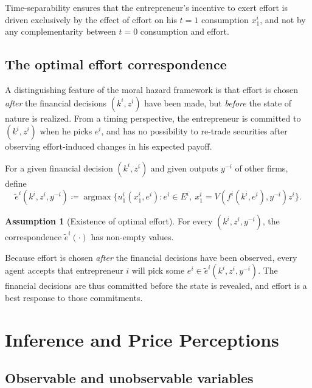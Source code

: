 \documentclass[11pt,a4paper,oneside]{book}
\DeclareMathOperator*{\argmax}{argmax}
\theoremstyle{plain}
\theoremstyle{definition}
\newtheorem{assumption}[theorem]{Assumption}
\theoremstyle{remark}
\numberwithin{equation}{chapter}
\begin{document}
Time-separability ensures that the entrepreneur's incentive to exert effort is driven exclusively by the effect of effort on his $t=1$ consumption $x^i_1$, and not by any complementarity between $t=0$ consumption and effort.

\subsection{The optimal effort correspondence}

A distinguishing feature of the moral hazard framework is that effort is chosen \emph{after} the financial decisions $(k^i, z^i)$ have been made, but \emph{before} the state of nature is realized.
From a timing perspective, the entrepreneur is committed to $(k^i, z^i)$ when he picks $e^i$, and has no possibility to re-trade securities after observing effort-induced changes in his expected payoff.

For a given financial decision $(k^i, z^i)$ and given outputs $y^{-i}$ of other firms, define
\begin{equation}\label{eq:opt-effort}
  \widetilde{e}^i(k^i, z^i, y^{-i})
  \coloneqq \argmax \bigl\{ u^i_1(x^i_1, e^i) \colon e^i \in E^i, \ x^i_1 = V(f^i(k^i, e^i), y^{-i}) z^i \bigr\}.
\end{equation}

\begin{assumption}[Existence of optimal effort]\label{ass:opt-effort-exists}
For every $(k^i, z^i, y^{-i})$, the correspondence $\widetilde{e}^i(\cdot)$ has non-empty values.
\end{assumption}

Because effort is chosen \emph{after} the financial decisions have been observed, every agent accepts that entrepreneur $i$ will pick some $e^i \in \widetilde{e}^i(k^i, z^i, y^{-i})$.
The financial decisions are thus committed before the state is revealed, and effort is a best response to those commitments.

\section{Inference and Price Perceptions}
\label{sec:MH-inference}

\subsection{Observable and unobservable variables}
\end{document}
